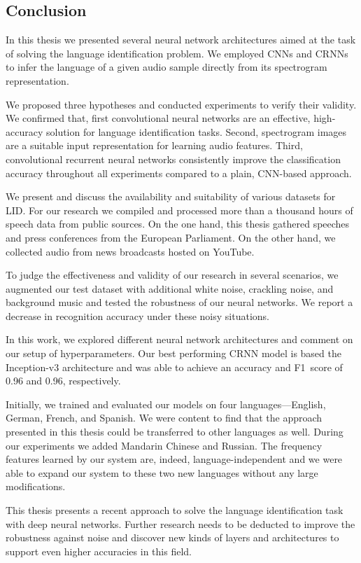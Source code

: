 \subsection{Conclusion}
In this thesis we presented several neural network architectures aimed at the task of solving the language identification problem. We employed CNNs and CRNNs to infer the language of a given audio sample directly from its spectrogram representation. 

We proposed three hypotheses and conducted experiments to verify their validity. We confirmed that, first convolutional neural networks are an effective, high-accuracy solution for language identification tasks. Second, spectrogram images are a suitable input representation for learning audio features. Third, convolutional recurrent neural networks consistently improve the classification accuracy throughout all experiments compared to a plain, CNN-based approach.

We present and discuss the availability and suitability of various datasets for LID. For our research we compiled and processed more than a thousand hours of speech data from public sources. On the one hand, this thesis gathered speeches and press conferences from the European Parliament. On the other hand, we collected audio from news broadcasts hosted on YouTube.

To judge the effectiveness and validity of our research in several scenarios, we augmented our test dataset with additional white noise, crackling noise, and background music and tested the robustness of our neural networks. We report a decrease in recognition accuracy under these noisy situations.

In this work, we explored different neural network architectures and comment on our setup of hyperparameters. Our best performing CRNN model is based the Inception-v3 architecture and was able to achieve an accuracy and F1~score of \num{0.96} and \num{0.96}, respectively.

Initially, we trained and evaluated our models on four languages---English, German, French, and Spanish. We were content to find that the approach presented in this thesis could be transferred to other languages as well. During our experiments we added Mandarin Chinese and Russian. The frequency features learned by our system are, indeed, language-independent and we were able to expand our system to these two new languages without any large modifications.

This thesis presents a recent approach to solve the language identification task with deep neural networks. Further research needs to be deducted to improve the robustness against noise and discover new kinds of layers and architectures to support even higher accuracies in this field. 
